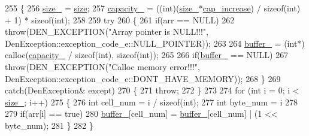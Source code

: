 \begin{DoxyCode}
255     \{
256         \hyperlink{classVector_3_01bool_01_4_a07895adb41b2c819f85640e35c0d4ae0}{size\_} = \hyperlink{classVector_3_01bool_01_4_acb9a245334b171ea1ad0d9bda20da76e}{size};
257         \hyperlink{classVector_3_01bool_01_4_ac3da0e4580bca55cab445ed3f9c50f2d}{capacity\_} = ((int)(\hyperlink{classVector_3_01bool_01_4_a07895adb41b2c819f85640e35c0d4ae0}{size\_}*\hyperlink{classVector_3_01bool_01_4_a6fe84e4e9414012807ec5ccd49711e62}{cap\_increase}) / \textcolor{keyword}{sizeof}(int) + 1) * \textcolor{keyword}{sizeof}(int);
258 
259         \textcolor{keywordflow}{try}
260             \{
261                 \textcolor{keywordflow}{if}(arr == NULL)
262                     \textcolor{keywordflow}{throw}(DEN\_EXCEPTION(\textcolor{stringliteral}{"Array pointer is NULL!!!"}, 
      DenException::exception\_code\_e::NULL\_POINTER));
263 
264                 \hyperlink{classVector_3_01bool_01_4_ae2183c11de877eb13209c6a5a593604f}{buffer\_} = (\textcolor{keywordtype}{int}*) calloc(\hyperlink{classVector_3_01bool_01_4_ac3da0e4580bca55cab445ed3f9c50f2d}{capacity\_} / \textcolor{keyword}{sizeof}(\textcolor{keywordtype}{int}), \textcolor{keyword}{sizeof}(int));
265 
266                 \textcolor{keywordflow}{if}(\hyperlink{classVector_3_01bool_01_4_ae2183c11de877eb13209c6a5a593604f}{buffer\_} == NULL)
267                     \textcolor{keywordflow}{throw}(DEN\_EXCEPTION(\textcolor{stringliteral}{"Calloc memory error!!!"}, 
      DenException::exception\_code\_e::DONT\_HAVE\_MEMORY));
268             \}
269         \textcolor{keywordflow}{catch}(DenException& except)
270             \{
271                 \textcolor{keywordflow}{throw};
272             \}
273 
274         \textcolor{keywordflow}{for} (\textcolor{keywordtype}{int} i = 0; i < \hyperlink{classVector_3_01bool_01_4_a07895adb41b2c819f85640e35c0d4ae0}{size\_}; i++)
275             \{
276                 \textcolor{keywordtype}{int} cell\_num = i / \textcolor{keyword}{sizeof}(int);
277                 \textcolor{keywordtype}{int} byte\_num = i %
278 
279                 \textcolor{keywordflow}{if}(arr[i] == \textcolor{keyword}{true})
280                     \hyperlink{classVector_3_01bool_01_4_ae2183c11de877eb13209c6a5a593604f}{buffer\_}[cell\_num] = \hyperlink{classVector_3_01bool_01_4_ae2183c11de877eb13209c6a5a593604f}{buffer\_}[cell\_num] | (1 << byte\_num);
281             \}
282     \}
\end{DoxyCode}
\mbox{\label{classVector_3_01bool_01_4_a2dff535956e32681b2fa7772123d8a62}} 
